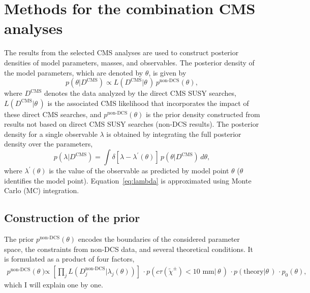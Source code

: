 \section{Methods for the combination CMS analyses}
\label{sec:anl}
The results from the selected CMS analyses are used to construct posterior densities of model
parameters, masses, and observables. The posterior density of the
model parameters, which are denoted by $\theta$, is given by 
\begin{equation}
	p(\theta|D^\textrm{CMS}) \propto L(D^\textrm{CMS} | \theta\, ) \, p^\textrm{non-DCS}(\theta),
	\label{eq:posterior}
\end{equation}
where $D^\textrm{CMS}$ denotes the data analyzed by the direct CMS
SUSY searches, $L(D^\textrm{CMS} | \theta\, )$ is the associated CMS
likelihood that
incorporates the impact of these direct CMS searches, and
$p^\textrm{non-DCS}(\theta)$ is the prior density constructed from
results not based on direct CMS SUSY searches (non-DCS results).
The posterior density for a single observable $\lambda$ is obtained by integrating the full posterior density over the parameters,
\begin{equation}
	p(\lambda|D^\textrm{CMS}) = \int \delta[\lambda- \lambda^\prime(\theta)] \, p(\theta| D^\textrm{CMS}) \, d\theta,
	\label{eq:lambda}
\end{equation}
where $\lambda^\prime(\theta)$ is the value of the observable as
predicted by model point $\theta$ ($\theta$ identifies the model point). Equation~\ref{eq:lambda} is approximated using Monte Carlo (MC) integration.  

\subsection{Construction of the prior}
\label{sec:prior}
The prior $p^\textrm{non-DCS}(\theta)$
encodes the boundaries of the considered parameter space, the constraints from non-DCS data, and several theoretical conditions. It is formulated as a product of four factors,
\begin{align}
	p^\textrm{non-DCS}(\theta) &\propto \left [ \prod_j L(D_j^\textrm{non-DCS} | \lambda_j(\theta)) \right] \,
		\cdot p(c\tau(\tilde{\chi}^\pm) < \textrm{10 mm}|\,\theta\,) \,
		 \cdot p(\textrm{theory}|\theta\,) \,
		 \cdot p_0(\theta),
		\label{eq:prior}
\end{align}
which I will explain one by one.

